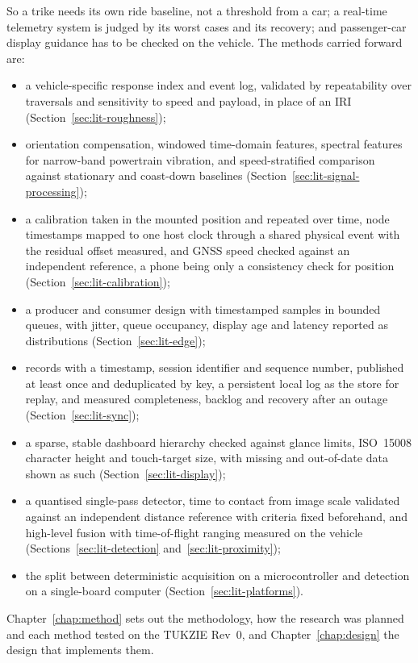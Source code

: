 So a trike needs its own ride baseline, not a threshold from a car; a real-time telemetry system is judged by its worst cases and its recovery; and passenger-car display guidance has to be checked on the vehicle. The methods carried forward are:
\begin{itemize}
\item a vehicle-specific response index and event log, validated by repeatability over traversals and sensitivity to speed and payload, in place of an IRI (Section~\ref{sec:lit-roughness});
\item orientation compensation, windowed time-domain features, spectral features for narrow-band powertrain vibration, and speed-stratified comparison against stationary and coast-down baselines (Section~\ref{sec:lit-signal-processing});
\item a calibration taken in the mounted position and repeated over time, node timestamps mapped to one host clock through a shared physical event with the residual offset measured, and GNSS speed checked against an independent reference, a phone being only a consistency check for position (Section~\ref{sec:lit-calibration});
\item a producer and consumer design with timestamped samples in bounded queues, with jitter, queue occupancy, display age and latency reported as distributions (Section~\ref{sec:lit-edge});
\item records with a timestamp, session identifier and sequence number, published at least once and deduplicated by key, a persistent local log as the store for replay, and measured completeness, backlog and recovery after an outage (Section~\ref{sec:lit-sync});
\item a sparse, stable dashboard hierarchy checked against glance limits, ISO~15008 character height and touch-target size, with missing and out-of-date data shown as such (Section~\ref{sec:lit-display});
\item a quantised single-pass detector, time to contact from image scale validated against an independent distance reference with criteria fixed beforehand, and high-level fusion with time-of-flight ranging measured on the vehicle (Sections~\ref{sec:lit-detection} and~\ref{sec:lit-proximity});
\item the split between deterministic acquisition on a microcontroller and detection on a single-board computer (Section~\ref{sec:lit-platforms}).
\end{itemize}
Chapter~\ref{chap:method} sets out the methodology, how the research was planned and each method tested on the TUKZIE Rev~0, and Chapter~\ref{chap:design} the design that implements them.
